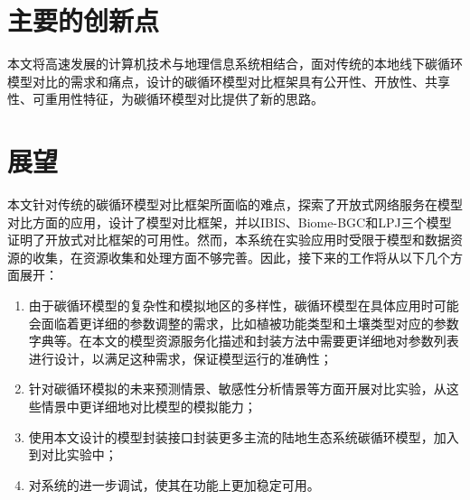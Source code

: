 \section{主要的创新点}
本文将高速发展的计算机技术与地理信息系统相结合，面对传统的本地线下碳循环模型对比的需求和痛点，设计的碳循环模型对比框架具有公开性、开放性、共享性、可重用性特征，为碳循环模型对比提供了新的思路。

\section{展望}
本文针对传统的碳循环模型对比框架所面临的难点，探索了开放式网络服务在模型对比方面的应用，设计了模型对比框架，并以IBIS、Biome-BGC和LPJ三个模型证明了开放式对比框架的可用性。然而，本系统在实验应用时受限于模型和数据资源的收集，在资源收集和处理方面不够完善。因此，接下来的工作将从以下几个方面展开：

\begin{enumerate}[(1)]
    \item 由于碳循环模型的复杂性和模拟地区的多样性，碳循环模型在具体应用时可能会面临着更详细的参数调整的需求，比如植被功能类型和土壤类型对应的参数字典等。在本文的模型资源服务化描述和封装方法中需要更详细地对参数列表进行设计，以满足这种需求，保证模型运行的准确性；
    \item 针对碳循环模拟的未来预测情景、敏感性分析情景等方面开展对比实验，从这些情景中更详细地对比模型的模拟能力；
    \item 使用本文设计的模型封装接口封装更多主流的陆地生态系统碳循环模型，加入到对比实验中；
    \item 对系统的进一步调试，使其在功能上更加稳定可用。
\end{enumerate}